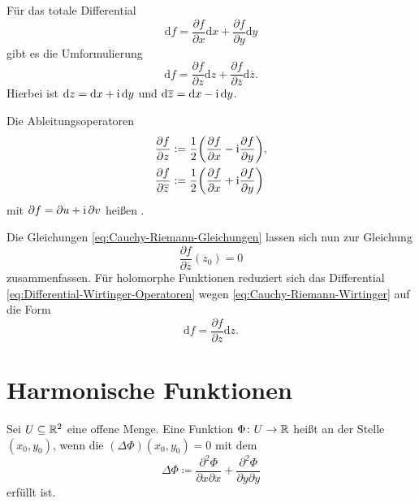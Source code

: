 Für das totale Differential
\begin{equation}
\mathrm df = \frac{\partial f}{\partial x}\mathrm dx+\frac{\partial f}{\partial y}\mathrm dy
\end{equation}
gibt es die Umformulierung
\begin{equation}\label{eq:Differential-Wirtinger-Operatoren}
\mathrm df = \frac{\partial f}{\partial z}\mathrm dz+\frac{\partial f}{\partial\overline z}\mathrm d\overline z.
\end{equation}
Hierbei ist $\mathrm dz=\mathrm dx+\mathrm i\,\mathrm dy$ und $\mathrm d\overline{z}=\mathrm dx-\mathrm i\,\mathrm dy$.

Die Ableitungsoperatoren
\begin{align}
\frac{\partial f}{\partial z}
&:=\frac{1}{2}\bigg(\frac{\partial f}{\partial x}-\mathrm i\frac{\partial f}{\partial y}\bigg),\\
\frac{\partial f}{\partial\overline z}
&:=\frac{1}{2}\bigg(\frac{\partial f}{\partial x}+\mathrm i\frac{\partial f}{\partial y}\bigg)
\end{align}
mit $\partial f=\partial u+\mathrm i\,\partial v$ heißen .

Die Gleichungen \eqref{eq:Cauchy-Riemann-Gleichungen} lassen sich nun
zur Gleichung%
\begin{equation}\label{eq:Cauchy-Riemann-Wirtinger}
\frac{\partial f}{\partial\overline z}(z_0)=0
\end{equation}
zusammenfassen. Für holomorphe Funktionen reduziert sich das
Differential \eqref{eq:Differential-Wirtinger-Operatoren} wegen
\eqref{eq:Cauchy-Riemann-Wirtinger} auf die Form%
\begin{equation}
\mathrm df = \frac{\partial f}{\partial z}\mathrm dz.
\end{equation}

\section{Harmonische Funktionen}
\begin{definition}
Sei $U\subseteq\mathbb R^2$ eine offene Menge.
Eine Funktion $\Phi\colon U\to\mathbb R$ heißt 
an der Stelle $(x_0,y_0)$, wenn die 
$(\Delta\Phi)(x_0,y_0)=0$ mit dem %
\begin{equation}
\Delta\Phi\coloneq
\frac{\partial^2\Phi}{\partial x\partial x}+
\frac{\partial^2\Phi}{\partial y\partial y}
\end{equation}
erfüllt ist.
\end{definition}

